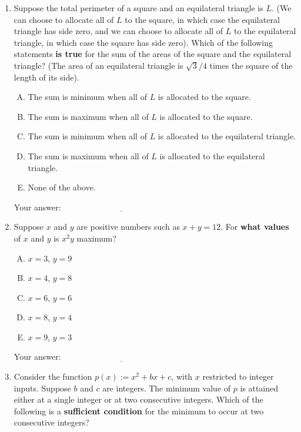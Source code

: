 \documentclass[10pt]{amsart}
\begin{document}
\begin{enumerate}
  {\bf PLEASE TURN OVER FOR REMAINING QUESTIONS}

  \newpage
\item Suppose the total perimeter of a square and an equilateral
  triangle is $L$. (We can choose to allocate all of $L$ to the
  square, in which case the equilateral triangle has side zero, and we
  can choose to allocate all of $L$ to the equilateral triangle, in
  which case the square has side zero). Which of the following
  statements {\bf is true} for the sum of the areas of the square and
  the equilateral triangle? (The area of an equilateral triangle is
  $\sqrt{3}/4$ times the square of the length of its side).
  \begin{enumerate}[(A)]
  \item The sum is minimum when all of $L$ is allocated to the square.
  \item The sum is maximum when all of $L$ is allocated to the square.
  \item The sum is minimum when all of $L$ is allocated to the
    equilateral triangle.
  \item The sum is maximum when all of $L$ is allocated to the
    equilateral triangle.
  \item None of the above.
  \end{enumerate}

  \vspace{0.1in}
  Your answer: $\underline{\qquad\qquad\qquad\qquad\qquad\qquad\qquad}$
  \vspace{0.5in}

\item Suppose $x$ and $y$ are positive numbers such as $x + y =
  12$. For {\bf what values} of $x$ and $y$ is $x^2y$ maximum?

  \begin{enumerate}[(A)]
  \item $x = 3$, $y = 9$
  \item $x = 4$, $y = 8$
  \item $x = 6$, $y = 6$
  \item $x = 8$, $y = 4$
  \item $x = 9$, $y = 3$
  \end{enumerate}

  \vspace{0.1in}
  Your answer: $\underline{\qquad\qquad\qquad\qquad\qquad\qquad\qquad}$
  \vspace{0.5in}

\item Consider the function $p(x) := x^2 + bx + c$, with $x$
  restricted to integer inputs. Suppose $b$ and $c$ are integers. The
  minimum value of $p$ is attained either at a single integer or at
  two consecutive integers. Which of the following is a {\bf
  sufficient condition} for the minimum to occur at two consecutive
  integers?


\end{enumerate}
\end{document}
